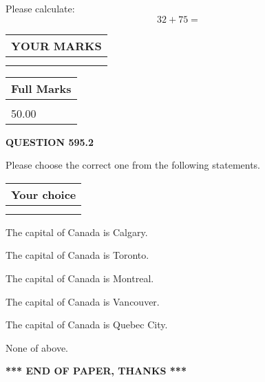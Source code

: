 \documentclass[12pt]{article}
\begin{document}
  
 
Please calculate:
\begin{equation}
32 +  %
75 = \nonumber
\end{equation}
 

 

 
  
\vspace{0.2in}
  
\noindent\begin{tabular}{|l|}
\hline
 YOUR MARKS  \\
\hline
 \\ 
 \\ 
\hline
\end{tabular}
\hspace{0.05in} \begin{tabular}{|l|}
\hline
 Full Marks  \\
\hline
 \\ 
50.00 \\
\hline
\end{tabular}
{\textbf{\Large{QUESTION
595.2 
}}}
  
  
Please choose the correct one from the following statements.
  
  
\noindent\hspace{3.0in} \begin{tabular}{|l|}
\hline
Your choice \\
\hline
 \\ 
 \\ 
\hline
\end{tabular}
  
  
 
 
The capital of Canada is Calgary.
 
 
The capital of Canada is Toronto.
 
 
The capital of Canada is Montreal.
 
 
The capital of Canada is Vancouver.
 
 
The capital of Canada is Quebec City.
 
 
 None of above.
 
 
   
   
 \vspace{0.2in}
 
   
   
   
   
\vspace{1.0in} 
{\textbf{\large{ *** END OF PAPER, THANKS *** }}} 
   
\end{document}
